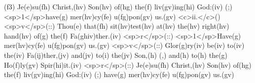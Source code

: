 (f3) Je(e)su(fh) Christ,(hv) Son(hv) of(hg) the(f) liv(gv)ing(hi) God:(iv) (;) <sp>1</sp>have(g) mer(hv)cy(fe) u(fg)pon(gv) us.(gv) <c>ii.</c>() <sp>v</sp>(::) Thou(e) that(fh) sit(hv)test(hv) at(hv) the(hv) right(hv) hand(hv) of(g) the(f) Fa(ghiv)ther.(iv) <sp>r</sp>(::) <sp>1</sp>Have(g) mer(hv)cy(fe) u(fg)pon(gv) us.(gv) <sp>v</sp>(::) Glor(g)ry(iv) be(iv) to(iv) the(iv) Fa(ij)ther,(jv) and(jv) to(i) the(jv) Son,(h) (,) and(h) to(h) the(g) Ho(f)ly(gv) Spir(hi)it.(iv) <sp>r</sp>(::) Je(e)su(fh) Christ,(hv) Son(hv) of(hg) the(f) liv(gv)ing(hi) God:(iv) (;) have(g) mer(hv)cy(fe) u(fg)pon(gv) us.(gv)